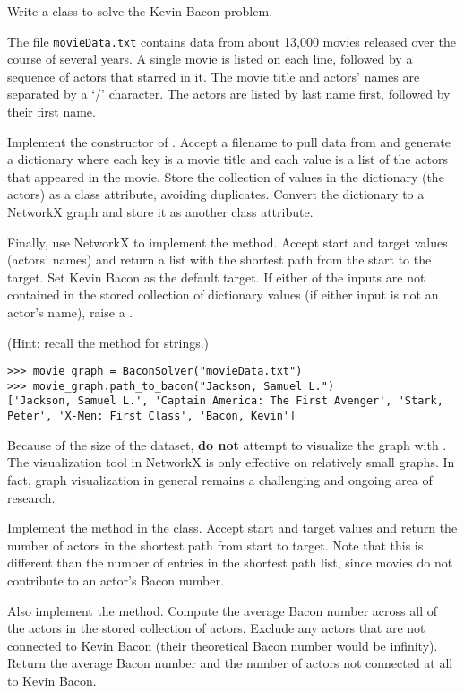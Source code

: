 \begin{problem}
Write a  class to solve the Kevin Bacon problem.

The file \texttt{movieData.txt} contains data from about 13,000 movies released over the course of several years.
A single movie is listed on each line, followed by a sequence of actors that starred in it.
The movie title and actors' names are separated by a `/' character.
The actors are listed by last name first, followed by their first name.

Implement the constructor of .
Accept a filename to pull data from and generate a dictionary where each key is a movie title and each value is a list of the actors that appeared in the movie.
Store the collection of values in the dictionary (the actors) as a class attribute, avoiding duplicates.
Convert the dictionary to a NetworkX graph and store it as another class attribute.

Finally, use NetworkX to implement the  method.
Accept start and target values (actors' names) and return a list with the shortest path from the start to the target.
Set Kevin Bacon as the default target.
If either of the inputs are not contained in the stored collection of dictionary values (if either input is not an actor's name), raise a .

(Hint: recall the  method for strings.)

\begin{lstlisting}
>>> movie_graph = BaconSolver("movieData.txt")
>>> movie_graph.path_to_bacon("Jackson, Samuel L.")
['Jackson, Samuel L.', 'Captain America: The First Avenger', 'Stark,
Peter', 'X-Men: First Class', 'Bacon, Kevin']
\end{lstlisting}

\begin{warn}
Because of the size of the dataset, \textbf{do not} attempt to visualize the graph with .
The visualization tool in NetworkX is only effective on relatively small graphs.
In fact, graph visualization in general remains a challenging and ongoing area of research.
\end{warn}
\end{problem}

\begin{problem}
Implement the  method in the  class.
Accept start and target values and return the number of actors in the shortest path from start to target.
Note that this is different than the number of entries in the shortest path list, since movies do not contribute to an actor's Bacon number.

Also implement the  method.
Compute the average Bacon number across all of the actors in the stored collection of actors.
Exclude any actors that are not connected to Kevin Bacon (their theoretical Bacon number would be infinity).
Return the average Bacon number and the number of actors not connected at all to Kevin Bacon.
\end{problem}

